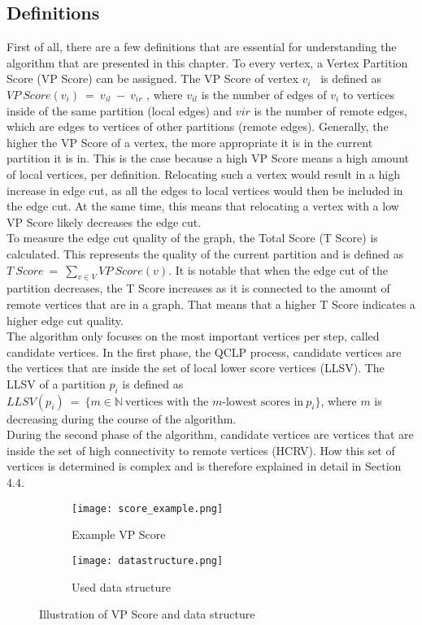 \documentclass[acmsmall,nonacm,screen,review]{acmart}
\begin{document}
\subsection{Definitions}
First of all, there are a few definitions that are essential for understanding the algorithm that are presented in this chapter. To every vertex, a Vertex Partition Score (VP Score) can be assigned. The VP Score of vertex $v_{i}$ \ is defined as $VP\ Score(v_{i})\ =\ v_{il}\ -\ v_{ir}$ , where $v_{il}$ is the number of edges of $v_{i}$ to vertices inside of the same partition (local edges) and $v{ir}$ is the number of remote edges, which are edges to vertices of other partitions (remote edges). Generally, the higher the VP Score of a vertex, the more appropriate it is in the current partition it is in. This is the case because a high VP Score means a high amount of local vertices, per definition. Relocating such a vertex would result in a high increase in edge cut, as all the edges to local vertices would then be included in the edge cut. At the same time, this means that relocating a vertex with a low VP Score likely decreases the edge cut. \\
To measure the edge cut quality of the graph, the Total Score (T Score) is calculated. This represents the quality of the current partition and is defined as $T\ Score\ =\ \sum_{v\in V} VP\ Score(v)$. It is notable that when the edge cut of the partition decreases, the T Score increases as it is connected to the amount of remote vertices that are in a graph. That means that a higher T Score indicates a higher edge cut quality. \\
The algorithm only focuses on the most important vertices per step, called candidate vertices. In the first phase, the QCLP process, candidate vertices are the vertices that are inside the set of local lower score vertices (LLSV). The LLSV of a partition $p_{i}$ is defined as $LLSV(p_{i})\ =\ \{ m\in \mathbb{N}\ \text{vertices with the }m\text{-lowest scores in}\ p_{i}\}$, where $m$ is decreasing during the course of the algorithm. \\
During the second phase of the algorithm, candidate vertices are vertices that are inside the set of high connectivity to remote vertices (HCRV). How this set of vertices is determined is complex and is therefore explained in detail in Section 4.4.
\begin{figure}[bt!]
     \centering
     \begin{subfigure}[b]{0.45\textwidth}
         \centering
         \texttt{[image: score\_example.png]}
         \caption{Example VP Score}
         \label{vp_score}
     \end{subfigure}
     \hfill
     \begin{subfigure}[b]{0.45\textwidth}
         \centering
         \texttt{[image: datastructure.png]}
         \caption{Used data structure}
         \label{data_structure}
     \end{subfigure}
     \caption{Illustration of VP Score and data structure}
     \label{combi}
\end{figure}
\end{document}
